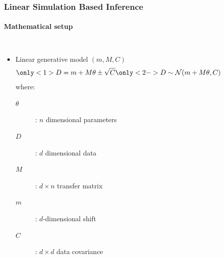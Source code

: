 \documentclass[aspectratio=169]{beamer}
\begin{document}
\begin{frame}
    \frametitle{Linear Simulation Based Inference}
    \framesubtitle{Mathematical setup}
    \begin{columns}[t]
        \begin{itemize}
            \item Linear generative model $(m,M,C)$
                \[ 
                    \only<1>{D = m + M \theta \pm \sqrt{C}}%
                    \only<2->{D \sim \mathcal{N}(m + M \theta, C)}%
                \]
                where:
                \begin{description}
                    \item[$\theta$]: $n$ dimensional parameters
                    \item[$D$]: $d$ dimensional data
                    \item[$M$]: $d\times n$ transfer matrix
                    \item[$m$]: $d$-dimensional shift
                    \item[$C$]:  $d\times d$ data covariance
                \end{description}
        \end{itemize}

    \end{columns}
\end{frame}
\end{document}
